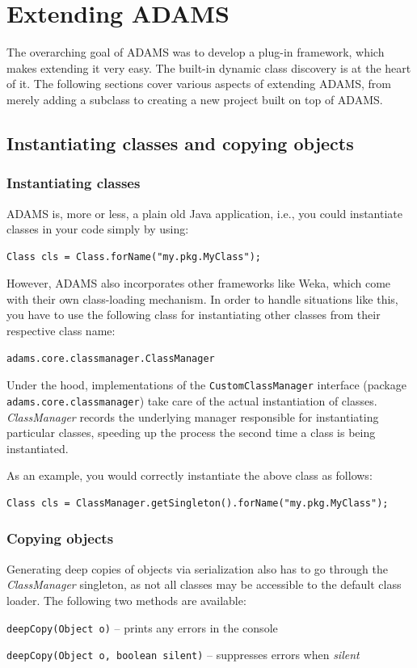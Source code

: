 \chapter{Extending ADAMS}
The overarching goal of ADAMS was to develop a plug-in framework, which makes
extending it very easy. The built-in dynamic class discovery is at the heart of
it. The following sections cover various aspects of extending ADAMS, from merely
adding a subclass to creating a new project built on top of ADAMS.

\section{Instantiating classes and copying objects}
\label{instantiating_classes_and_copying_objects}
\subsection{Instantiating classes}
ADAMS is, more or less, a plain old Java application, i.e., you could instantiate
classes in your code simply by using:
\begin{verbatim}
Class cls = Class.forName("my.pkg.MyClass");
\end{verbatim}
However, ADAMS also incorporates other frameworks like Weka, which come with
their own class-loading mechanism. In order to handle situations like this,
you have to use the following class for instantiating other classes from their
respective class name:
\begin{verbatim}
adams.core.classmanager.ClassManager
\end{verbatim}
Under the hood, implementations of the \verb|CustomClassManager|
interface (package \verb|adams.core.classmanager|) take care of the actual
instantiation of classes. \textit{ClassManager} records the underlying manager
responsible for instantiating particular classes, speeding up the process
the second time a class is being instantiated.

As an example, you would correctly instantiate the above class as follows:
\begin{verbatim}
Class cls = ClassManager.getSingleton().forName("my.pkg.MyClass");
\end{verbatim}

\subsection{Copying objects}
Generating deep copies of objects via serialization also has to go through the
\textit{ClassManager} singleton, as not all classes may be accessible to the
default class loader. The following two methods are available:
\begin{tight_itemize}
  \item \texttt{deepCopy(Object o)} -- prints any errors in the console
  \item \texttt{deepCopy(Object o, boolean silent)} -- suppresses errors when
  \textit{silent}
\end{tight_itemize}


